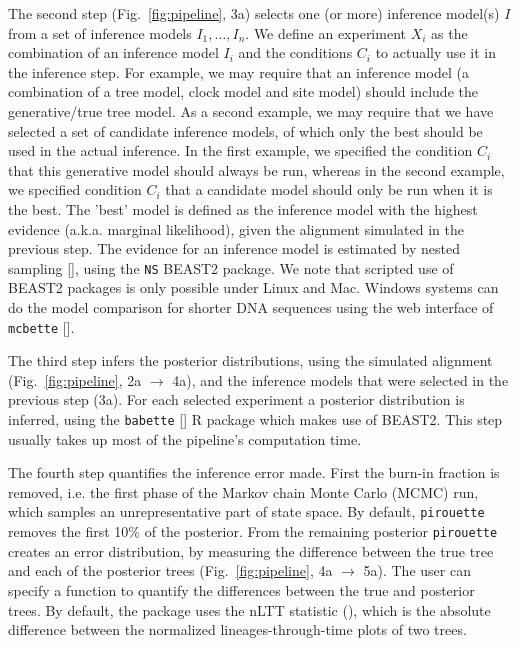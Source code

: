 The second step (Fig.~\ref{fig:pipeline}, 3a)
selects one (or more) inference model(s) $I$ from a set of inference models $I_{1},\dots,I_{n}$. 
We define an experiment $X_{i}$ as the combination of 
an inference model $I_{i}$ and the conditions $C_{i}$ 
to actually use it in the inference step.
For example, we may require that an inference
model (a combination of a tree model, clock model and site model) 
should include the generative/true tree model. 
As a second example, we may require that we have selected a set of 
candidate inference models,
of which only the best should be used in the actual inference.
In the first example, we specified the condition $C_{i}$ that this
generative model should always be run, whereas in the second example,
we specified condition $C_{i}$ that a candidate model should only be run
when it is the best.
The 'best' model is defined as the inference model with
the highest evidence (a.k.a. marginal likelihood), given the alignment 
simulated in the previous step.
The evidence for an inference model is estimated by nested 
sampling [\cite{russel2019model}], using the \verb;NS; BEAST2 package. 
We note that scripted use of BEAST2 packages is only possible under Linux and Mac.
Windows systems can do the model comparison for shorter DNA sequences 
using the web interface of \verb;mcbette; [\cite{mcbette}].

The third step infers the posterior distributions,
using the simulated alignment (Fig.~\ref{fig:pipeline}, 2a $\rightarrow$ 4a),
and the inference models that were selected in the previous step (3a). 
For each selected experiment a posterior distribution is inferred, using the 
\verb;babette; [\cite{bilderbeek2018babette}] R package which makes use of BEAST2. 
This step usually takes up most of the pipeline's computation time.

The fourth step quantifies the inference error made. 
First the burn-in fraction is removed, i.e. the first phase of the 
Markov chain Monte Carlo (MCMC) run,
which samples an unrepresentative part of state space. 
By default, \verb;pirouette; 
removes the first 10\% of the posterior.
From the remaining posterior \verb;pirouette; 
creates an error distribution, by measuring the difference
between the true tree and each of the posterior 
trees (Fig.~\ref{fig:pipeline}, 4a $\rightarrow$ 5a).
The user can specify a function to quantify the differences between
the true and posterior trees. By default, the package uses the nLTT 
statistic (\cite{janzen2015approximate}), which is the absolute difference
between the normalized lineages-through-time plots of two trees.


